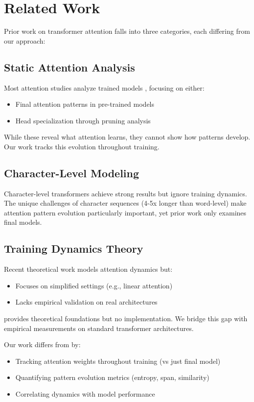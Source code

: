 \documentclass{article} %
\begin{document}
\section{Related Work}
\label{sec:related}

Prior work on transformer attention falls into three categories, each differing from our approach:

\subsection{Static Attention Analysis}
Most attention studies analyze trained models \citep{Clark2019WhatDB,Voita2019AnalyzingMS}, focusing on either:
\begin{itemize}
    \item Final attention patterns in pre-trained models
    \item Head specialization through pruning analysis \citep{Michel2019AreSH}
\end{itemize}
While these reveal what attention learns, they cannot show how patterns develop. Our work tracks this evolution throughout training.

\subsection{Character-Level Modeling}
Character-level transformers \citep{Al-Rfou2018CharacterLevelLM} achieve strong results but ignore training dynamics. The unique challenges of character sequences (4-5x longer than word-level) make attention pattern evolution particularly important, yet prior work only examines final models.

\subsection{Training Dynamics Theory}
Recent theoretical work \citep{Dong2021AttentionIN,Tian2023JoMADM} models attention dynamics but:
\begin{itemize}
    \item Focuses on simplified settings (e.g., linear attention)
    \item Lacks empirical validation on real architectures
\end{itemize}
\citep{Chen2024TrainingDO} provides theoretical foundations but no implementation. We bridge this gap with empirical measurements on standard transformer architectures.

Our work differs from \citep{karpathy2023nanogpt} by:
\begin{itemize}
    \item Tracking attention weights throughout training (vs just final model)
    \item Quantifying pattern evolution metrics (entropy, span, similarity)
    \item Correlating dynamics with model performance
\end{itemize}
\end{document}
